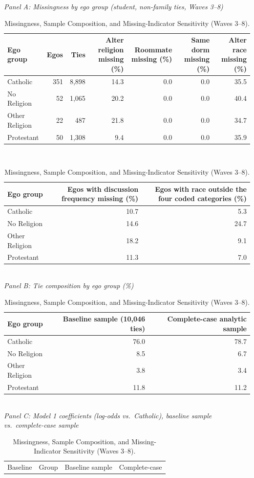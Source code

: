 \begin{table}[htbp]
\caption{\label{tab:missingness}Missingness, Sample Composition, and Missing-Indicator Sensitivity (Waves 3--8).}
\centering
\scriptsize
\textit{Panel A: Missingness by ego group (student, non-family ties, Waves 3--8)}\\[2pt]
\begin{tabular}{lrrrrrr}
\toprule
Ego group & Egos & Ties & Alter religion missing (\%) & Roommate missing (\%) & Same dorm missing (\%) & Alter race missing (\%) \\
\midrule
Catholic & 351 & 8,898 & 14.3 & 0.0 & 0.0 & 35.5 \\
No Religion & 52 & 1,065 & 20.2 & 0.0 & 0.0 & 40.4 \\
Other Religion & 22 &   487 & 21.8 & 0.0 & 0.0 & 34.7 \\
Protestant & 50 & 1,308 & 9.4 & 0.0 & 0.0 & 35.9 \\
\bottomrule
\end{tabular}
\\[6pt]
\begin{tabular}{lrr}
\toprule
Ego group & Egos with discussion frequency missing (\%) & Egos with race outside the four coded categories (\%) \\
\midrule
Catholic & 10.7 & 5.3 \\
No Religion & 14.6 & 24.7 \\
Other Religion & 18.2 & 9.1 \\
Protestant & 11.3 & 7.0 \\
\bottomrule
\end{tabular}
\\[8pt]
\textit{Panel B: Tie composition by ego group (\%)}\\[2pt]
\begin{tabular}{lrr}
\toprule
Ego group & Baseline sample (10,046 ties) & Complete-case analytic sample \\
\midrule
Catholic & 76.0 & 78.7 \\
No Religion & 8.5 & 6.7 \\
Other Religion & 3.8 & 3.4 \\
Protestant & 11.8 & 11.2 \\
\bottomrule
\end{tabular}
\\[8pt]
\textit{Panel C: Model 1 coefficients (log-odds vs.\ Catholic), baseline sample vs.\ complete-case sample}\\[2pt]
\begin{tabular}{llrrrr}
\toprule
Baseline & Group & \multicolumn{2}{c}{Baseline sample} & \multicolumn{2}{c}{Complete-case} \\

\end{tabular}
\end{table}
